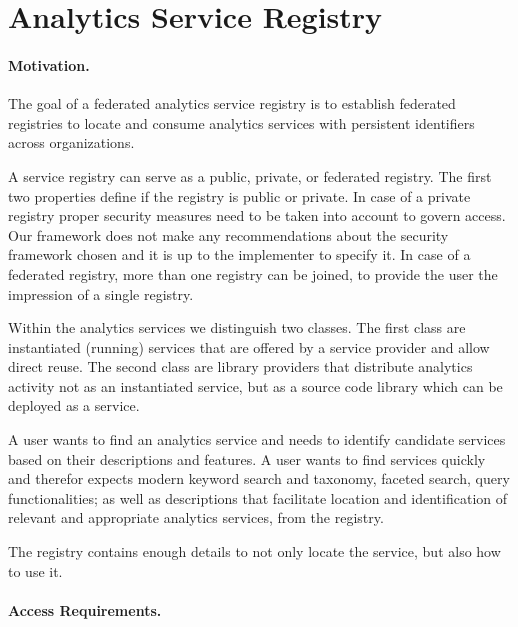 
\section{Analytics Service Registry}
\label{sec:registry}

\paragraph*{Motivation.} 

The goal of a federated analytics service registry is to establish
federated registries to locate and consume analytics services with
persistent identifiers across organizations.

A service registry can serve as a public, private, or federated
registry. The first two properties define if the registry is public or
private. In case of a private registry proper security measures need
to be taken into account to govern access. Our framework does not make
any recommendations about the security framework chosen and it is up
to the implementer to specify it. In case of a federated registry,
more than one registry can be joined, to provide the user the
impression of a single registry.

Within the analytics services we distinguish two classes. The first
class are instantiated (running) services that are offered by a
service provider and allow direct reuse. The second class are library
providers that distribute analytics activity not as an instantiated
service, but as a source code library which can be deployed as a
service.


 A user wants to find an analytics service and needs to
identify candidate services based on their descriptions and
features. A user wants to find services quickly and therefor expects
modern keyword search and taxonomy, faceted search, query
functionalities; as well as descriptions that facilitate location and
identification of relevant and appropriate analytics services, from the
registry.

The registry contains enough details to not only locate the service,
but also how to use it.

\paragraph*{Access Requirements.} 


